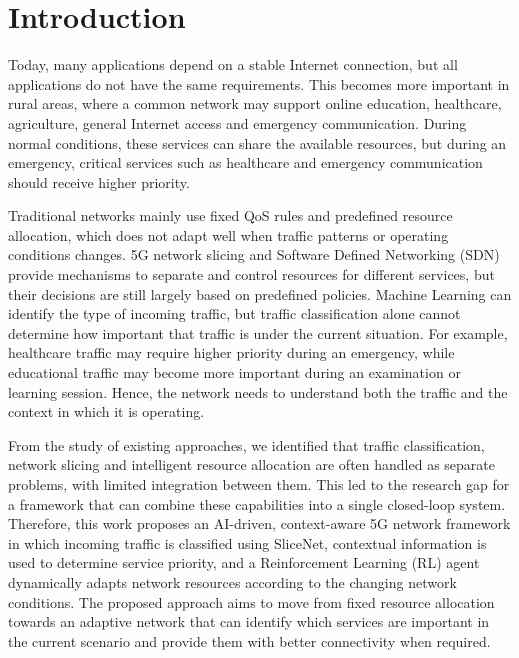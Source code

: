 \documentclass[12pt,a4paper]{report}
\begin{document}
	\chapter{Introduction}
	
	Today, many applications depend on a stable Internet connection, but all applications do not have the same requirements. This becomes more important in rural areas, where a common network may support online education, healthcare, agriculture, general Internet access and emergency communication. During normal conditions, these services can share the available resources, but during an emergency, critical services such as healthcare and emergency communication should receive higher priority. 
	
	Traditional networks mainly use fixed QoS rules and predefined resource allocation, which does not adapt well when traffic patterns or operating conditions changes. 5G network slicing and Software Defined Networking (SDN) provide mechanisms to separate and control resources for different services, but their decisions are still largely based on predefined policies. Machine Learning can identify the type of incoming traffic, but traffic classification alone cannot determine how important that traffic is under the current situation. For example, healthcare traffic may require higher priority during an emergency, while educational traffic may become more important during an examination or learning session. Hence, the network needs to understand both the traffic and the context in which it is operating.
	
	From the study of existing approaches, we identified that traffic classification, network slicing and intelligent resource allocation are often handled as separate problems, with limited integration between them. This led to the research gap for a framework that can combine these capabilities into a single closed-loop system. Therefore, this work proposes an AI-driven, context-aware 5G network framework in which incoming traffic is classified using SliceNet, contextual information is used to determine service priority, and a Reinforcement Learning (RL) agent dynamically adapts network resources according to the changing network conditions. The proposed approach aims to move from fixed resource allocation towards an adaptive network that can identify which services are important in the current scenario and provide them with better connectivity when required.

	
	
	
	
\end{document}
